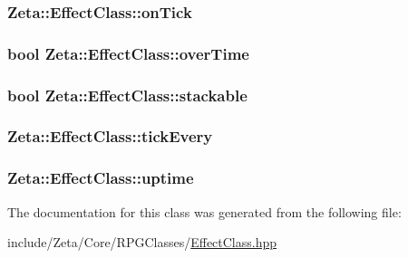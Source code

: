 \hypertarget{classZeta_1_1EffectClass_a14d197393f35d3ca3b61c000e8e573e0}{
\subsubsection[{on\+Tick}]{ Zeta\+::\+Effect\+Class\+::on\+Tick\hspace{0.3cm}{\ttfamily [private]}}}\label{classZeta_1_1EffectClass_a14d197393f35d3ca3b61c000e8e573e0}
\hypertarget{classZeta_1_1EffectClass_a03340f9f61382b97d518f6c2dd4fb646}{
\subsubsection[{over\+Time}]{\setlength{\rightskip}{0pt plus 5cm}bool Zeta\+::\+Effect\+Class\+::over\+Time\hspace{0.3cm}{\ttfamily [private]}}}\label{classZeta_1_1EffectClass_a03340f9f61382b97d518f6c2dd4fb646}
\hypertarget{classZeta_1_1EffectClass_a785b3ab368d2d9ea24078ec8ceee863f}{
\subsubsection[{stackable}]{\setlength{\rightskip}{0pt plus 5cm}bool Zeta\+::\+Effect\+Class\+::stackable\hspace{0.3cm}{\ttfamily [private]}}}\label{classZeta_1_1EffectClass_a785b3ab368d2d9ea24078ec8ceee863f}
\hypertarget{classZeta_1_1EffectClass_a321f0c4dc9e8b1ed3b10fac54e6169b2}{
\subsubsection[{tick\+Every}]{ Zeta\+::\+Effect\+Class\+::tick\+Every\hspace{0.3cm}{\ttfamily [private]}}}\label{classZeta_1_1EffectClass_a321f0c4dc9e8b1ed3b10fac54e6169b2}
\hypertarget{classZeta_1_1EffectClass_ad29c439f4a24e07879aa5d4c971ff892}{
\subsubsection[{uptime}]{ Zeta\+::\+Effect\+Class\+::uptime\hspace{0.3cm}{\ttfamily [private]}}}\label{classZeta_1_1EffectClass_ad29c439f4a24e07879aa5d4c971ff892}


The documentation for this class was generated from the following file\+:\begin{DoxyCompactItemize}
\item 
include/\+Zeta/\+Core/\+R\+P\+G\+Classes/\hyperlink{EffectClass_8hpp}{Effect\+Class.\+hpp}\end{DoxyCompactItemize}
